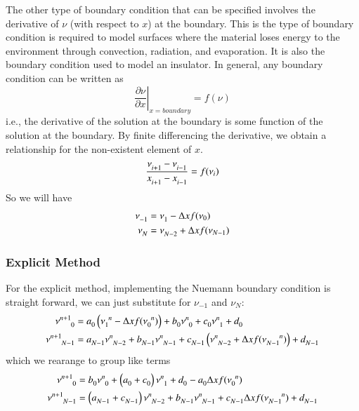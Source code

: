 \documentclass[letterpaper,12pt]{article}
\newcommand \bcf{f}
\begin{document}
The other type of boundary condition that can be specified involves the
derivative of $\nu$ (with respect to $x$) at the boundary. This is the type of
boundary condition is required to model surfaces where the material loses energy
to the environment through convection, radiation, and evaporation. It is also
the boundary condition used to model an insulator.  In general, any boundary
condition can be written as
\begin{equation}
  \label{eq:heat_flux_bc}
  \left. \frac{\partial \nu}{\partial x} \right|_{x = boundary} = \bcf(\nu)
\end{equation}
i.e., the derivative of the solution at the boundary is some function of the solution at the boundary.
By finite differencing the derivative, we obtain a relationship for the non-existent element of $x$.
\begin{equation}
  \label{eqn:FD_BC}
  \frac{ \nu\indices{_{i+1}} - \nu\indices{_{i-1}} }{ x\indices{_{i+1}} - x\indices{_{i-1}} } = \bcf(\nu_i)
\end{equation}
So we will have
\begin{align}
  \nu\indices{_{-1}} &= \nu\indices{_{1}} - \Delta x \bcf(\nu_0) \\
  \nu\indices{_{N}} &= \nu\indices{_{N-2}} + \Delta x \bcf(\nu_{N-1})
\end{align}

\subsubsection{Explicit Method}

For the explicit method, implementing the Nuemann boundary condition is straight forward, we can just substitute for $\nu_{-1}$ and $\nu_{N}$:
\begin{align}
\nu\indices{^{n+1}_{0}}
&
=
a\indices{_0} \left( \nu\indices{_{1}^{n}} - \Delta x\bcf(\nu\indices{_{0}^{n}}) \right)
+ b\indices{_0} \nu\indices{^{n  }_{0}}
+ c\indices{_0} \nu\indices{^{n  }_{1}}
+ d\indices{_0} \\
\nu\indices{^{n+1}_{N-1}}
&
=
a\indices{_{N-1}} \nu\indices{^{n}_{N-2}}
+ b\indices{_{N-1}} \nu\indices{^{n  }_{N-1}}
+ c\indices{_{N-1}} \left( \nu\indices{^{n}_{N-2}} + \Delta x\bcf(\nu\indices{_{N-1}^{n}}) \right)
+ d\indices{_{N-1}} \\
\end{align}
which we rearange to group like terms
\begin{align}
\nu\indices{^{n+1}_{0}}
&
=
  b\indices{_0} \nu\indices{^{n  }_{0}}
+ \left( a\indices{_0} + c\indices{_0} \right) \nu\indices{^{n  }_{1}}
+ d\indices{_0}
- a\indices{_0} \Delta x\bcf(\nu\indices{_{0}^{n}}) \\
\nu\indices{^{n+1}_{N-1}}
&
=
\left(a\indices{_{N-1}} + c\indices{_{N-1}} \right) \nu\indices{^{n}_{N-2}}
+ b\indices{_{N-1}} \nu\indices{^{n  }_{N-1}}
+ c\indices{_{N-1}} \Delta x\bcf(\nu\indices{_{N-1}^{n}})
+ d\indices{_{N-1}}
\end{align}
\end{document}
